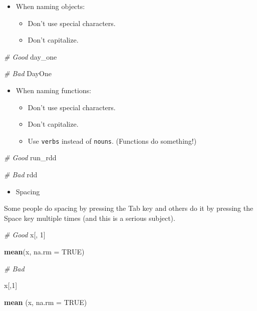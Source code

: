\documentclass[
]{book}
\newenvironment{Shaded}{\begin{snugshade}}{\end{snugshade}}
\newcommand{\CommentTok}[1]{\textcolor[rgb]{0.56,0.35,0.01}{\textit{#1}}}
\newcommand{\DataTypeTok}[1]{\textcolor[rgb]{0.13,0.29,0.53}{#1}}
\newcommand{\DecValTok}[1]{\textcolor[rgb]{0.00,0.00,0.81}{#1}}
\newcommand{\KeywordTok}[1]{\textcolor[rgb]{0.13,0.29,0.53}{\textbf{#1}}}
\newcommand{\NormalTok}[1]{#1}
\newcommand{\OtherTok}[1]{\textcolor[rgb]{0.56,0.35,0.01}{#1}}
\providecommand{\tightlist}{%
  \setlength{\itemsep}{0pt}\setlength{\parskip}{0pt}}
\begin{document}
\begin{itemize}
\tightlist
\item
  When naming objects:

  \begin{itemize}
  \tightlist
  \item
    Don't use special characters.
  \item
    Don't capitalize.
  \end{itemize}
\end{itemize}

\begin{Shaded}
\begin{Highlighting}[]
\CommentTok{\# Good }
\NormalTok{day\_one}
    
\CommentTok{\# Bad }
\NormalTok{DayOne}
\end{Highlighting}
\end{Shaded}

\begin{itemize}
\tightlist
\item
  When naming functions:

  \begin{itemize}
  \tightlist
  \item
    Don't use special characters.
  \item
    Don't capitalize.
  \item
    Use \texttt{verbs} instead of \texttt{nouns}. (Functions do something!)
  \end{itemize}
\end{itemize}

\begin{Shaded}
\begin{Highlighting}[]
\CommentTok{\# Good }
\NormalTok{run\_rdd }

\CommentTok{\# Bad }
\NormalTok{rdd}
\end{Highlighting}
\end{Shaded}

\begin{itemize}
\tightlist
\item
  Spacing
\end{itemize}

Some people do spacing by pressing the Tab key and others do it by pressing the Space key multiple times (and this is a serious subject).

\begin{Shaded}
\begin{Highlighting}[]
\CommentTok{\# Good}
\NormalTok{x[, }\DecValTok{1}\NormalTok{] }

\KeywordTok{mean}\NormalTok{(x, }\DataTypeTok{na.rm =} \OtherTok{TRUE}\NormalTok{) }

\CommentTok{\# Bad}

\NormalTok{x[,}\DecValTok{1}\NormalTok{]}

\KeywordTok{mean}\NormalTok{ (x, }\DataTypeTok{na.rm =} \OtherTok{TRUE}\NormalTok{)}
\end{Highlighting}
\end{Shaded}
\end{document}
